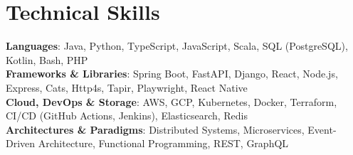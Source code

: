 \documentclass[letterpaper,11pt]{article}
\begin{document}
\section{Technical Skills}
 \begin{itemize}[leftmargin=0.12in, label={}]
    \small{\item{
     \textbf{Languages}{: Java, Python, TypeScript, JavaScript, Scala, SQL (PostgreSQL), Kotlin, Bash, PHP} \\
     \textbf{Frameworks \& Libraries}{: Spring Boot, FastAPI, Django, React, Node.js, Express, Cats, Http4s, Tapir, Playwright, React Native} \\
     \textbf{Cloud, DevOps \& Storage}{: AWS, GCP, Kubernetes, Docker, Terraform, CI/CD (GitHub Actions, Jenkins), Elasticsearch, Redis} \\
     \textbf{Architectures \& Paradigms}{: Distributed Systems, Microservices, Event-Driven Architecture, Functional Programming, REST, GraphQL}
    }}
 \end{itemize}
\end{document}
